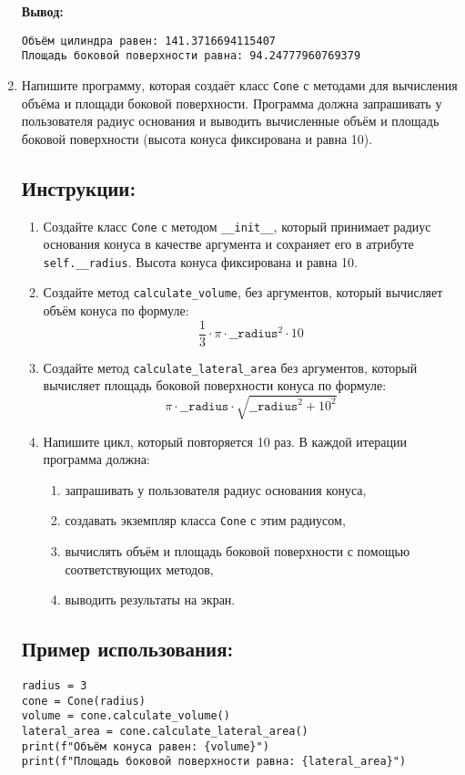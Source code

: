 \begin{enumerate}
\textbf{Вывод:}
\begin{verbatim}
Объём цилиндра равен: 141.3716694115407
Площадь боковой поверхности равна: 94.24777960769379
\end{verbatim}

\item
Напишите программу, которая создаёт класс \texttt{Cone} с методами для вычисления объёма
и площади боковой поверхности. Программа должна запрашивать у пользователя радиус основания
и выводить вычисленные объём и площадь боковой поверхности (высота конуса фиксирована и равна 10).

\subsection*{Инструкции:}
\begin{enumerate}
\item Создайте класс \texttt{Cone} с методом
\texttt{\_\_init\_\_}, который принимает радиус основания конуса в
качестве аргумента и сохраняет его в атрибуте \texttt{self.\_\_radius}.
Высота конуса фиксирована и равна 10.

\item Создайте метод \texttt{calculate\_volume},
без аргументов, который вычисляет объём конуса по формуле:
\[
\frac{1}{3} \cdot \pi \cdot \texttt{\_\_radius}^2 \cdot 10
\]

\item Создайте метод \texttt{calculate\_lateral\_area} без аргументов,
который вычисляет площадь боковой поверхности конуса по формуле:
\[
\pi \cdot \texttt{\_\_radius} \cdot \sqrt{\texttt{\_\_radius}^2 + 10^2}
\]

\item Напишите цикл, который повторяется 10 раз. В каждой итерации программа должна:
\begin{enumerate}
\item запрашивать у пользователя радиус основания конуса,
\item создавать экземпляр класса \texttt{Cone} с этим радиусом,
\item вычислять объём и площадь боковой поверхности с помощью соответствующих методов,
\item выводить результаты на экран.
\end{enumerate}
\end{enumerate}

\subsection*{Пример использования:}
\begin{verbatim}
radius = 3
cone = Cone(radius)
volume = cone.calculate_volume()
lateral_area = cone.calculate_lateral_area()
print(f"Объём конуса равен: {volume}")
print(f"Площадь боковой поверхности равна: {lateral_area}")
\end{verbatim}


\end{enumerate}
